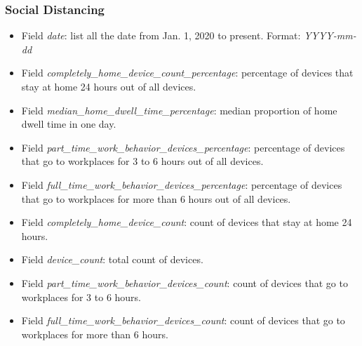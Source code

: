 \documentclass[10pt]{article}
\numberwithin{equation}{section}
\numberwithin{table}{section}
\numberwithin{figure}{section}
\begin{document}
\subsubsection{Social Distancing}
\begin{itemize}
	\item Field \textit{date}: list all the date from Jan. 1, 2020 to present. Format: \textit{YYYY-mm-dd}
	\item Field \textit{completely\_home\_device\_count\_percentage}: percentage of devices that stay at home 24 hours out of all devices.
	\item Field \textit{median\_home\_dwell\_time\_percentage}: median proportion of home dwell time in one day.
	\item Field \textit{part\_time\_work\_behavior\_devices\_percentage}: percentage of devices that go to workplaces for 3 to 6 hours out of all devices.
	\item Field \textit{full\_time\_work\_behavior\_devices\_percentage}: percentage of devices that go to workplaces for more than 6 hours out of all devices.
	\item Field \textit{completely\_home\_device\_count}: count of devices that stay at home 24 hours.
	\item Field \textit{device\_count}: total count of devices.
	\item Field \textit{part\_time\_work\_behavior\_devices\_count}: count of devices that go to workplaces for 3 to 6 hours.
	\item Field \textit{full\_time\_work\_behavior\_devices\_count}: count of devices that go to workplaces for more than 6 hours.
\end{itemize}
\end{document}

